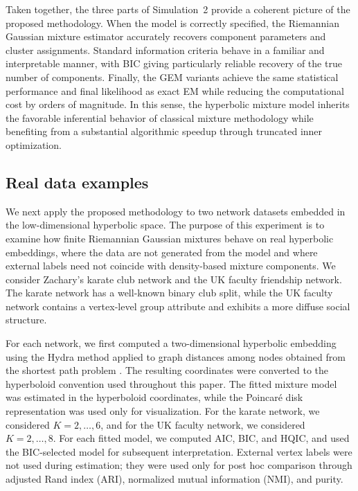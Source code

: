 \documentclass[11pt]{article}
\begin{document}
Taken together, the three parts of Simulation~2 provide a coherent picture of the proposed methodology. When the model is correctly specified, the Riemannian Gaussian mixture estimator accurately recovers component parameters and cluster assignments. Standard information criteria behave in a familiar and interpretable manner, with BIC giving particularly reliable recovery of the true number of components. Finally, the GEM variants achieve the same statistical performance and final likelihood as exact EM while reducing the computational cost by orders of magnitude. In this sense, the hyperbolic mixture model inherits the favorable inferential behavior of classical mixture methodology while benefiting from a substantial algorithmic speedup through truncated inner optimization.


\subsection{Real data examples}\label{subsec:realdata-networks}

We next apply the proposed methodology to two network datasets embedded in the low-dimensional hyperbolic space.  The purpose of this experiment is to examine how finite Riemannian Gaussian mixtures behave on real hyperbolic embeddings, where the data are not generated from the model and where external labels need not coincide with density-based mixture components. We consider Zachary's karate club network and the UK faculty friendship network. The karate network has a well-known binary club split, while the UK faculty network contains a vertex-level group attribute and exhibits a more diffuse social structure.

For each network, we first computed a two-dimensional hyperbolic embedding using the Hydra method \citep{keller-ressel_2020_HydraMethodStrainminimizing} applied to graph distances among nodes obtained from the shortest path problem \cite{dijkstra_1959_NoteTwoProblems}. The resulting coordinates were converted to the hyperboloid convention used throughout this paper. The fitted mixture model was estimated in the hyperboloid coordinates, while the Poincar\'e disk representation was used only for visualization. For the karate network, we considered \(K=2,\ldots,6\), and for the UK faculty network, we considered \(K=2,\ldots,8\). For each fitted model, we computed AIC, BIC, and HQIC, and used the BIC-selected model for subsequent interpretation. External vertex labels were not used during estimation; they were used only for post hoc comparison through adjusted Rand index (ARI), normalized mutual information (NMI), and purity.
\end{document}

